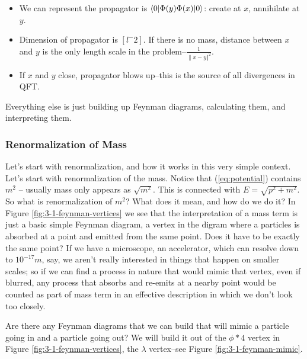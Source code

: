 \documentclass[]{article}
\begin{document}
\begin{itemize}
	\item We can represent the propagator is  $\braket{0|\Phi(y)\Phi(x)|0}$: create at $x$, annihilate at $y$.
	\item Dimension of propagator is $[l^-2]$. If there is no mass, distance between $x$ and $y$ is the only length scale in the problem--$\frac{1}{\lVert x-y \Vert^2}$. 
	\item If $x$ and $y$ close, propagator blows up--this is the source of all divergences in QFT.
\end{itemize}

Everything else is just building up Feynman diagrams, calculating them, and interpreting them.

\subsubsection{Renormalization of Mass}

Let's start with renormalization, and how it works in this very simple context.
Let's start with renormalization of the mass. Notice that (\ref{eq:potential}) contains $m^2$ -- usually mass only appears as $\sqrt{m^2}$. This is connected with $E=\sqrt{p^2 + m^2}$. So what is renormalization of $m^2$? What does it mean, and how do we do it? In Figure \ref{fig:3-1-feynman-vertices} we see that the interpretation of a mass term is just a basic simple Feynman diagram, a vertex in the digram where a particles is absorbed at a point and emitted from the same point. Does it have to be exactly the same point? If we have a microscope, an accelerator, which can resolve down to $10^{-17}m$, say, we aren't really interested in things that happen on smaller scales; so if we can find a process in nature that would mimic that vertex,  even if blurred, any process that absorbs and re-emits at a nearby point would be counted as part of mass term in an effective description in which we don't look too closely.

Are there any Feynman diagrams that we can build that will mimic a particle going in and a particle going out? We will build it out of the $\phi*4$ vertex in Figure \ref{fig:3-1-feynman-vertices}, the $\lambda$ vertex--see Figure \ref{fig:3-1-feynman-mimic}.
\end{document}
